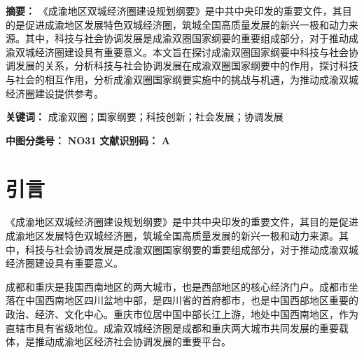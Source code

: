 \documentclass{CjC}
\begin{document}
\begin{center}

\vspace{10pt}


\vspace{10pt}

\end{center}

\vspace{10pt}

\songti

\textbf{摘要：} {\kaishu 《成渝地区双城经济圈建设规划纲要》是中共中央印发的重要文件，其目的是促进成渝地区发展特色双城经济圈，筑城全国高质量发展的新兴一极和动力来源。其中，科技与社会协调发展是成渝双圈国家纲要的重要组成部分，对于推动成渝双城经济圈建设具有重要意义。本文旨在探讨成渝双圈国家纲要中科技与社会协调发展的关系，分析科技与社会协调发展在成渝双圈国家纲要中的作用，探讨科技与社会的相互作用，分析成渝双圈国家纲要实施中的挑战与机遇，为推动成渝双城经济圈建设提供参考。}

\textbf{关键词：} 成渝双圈；国家纲要；科技创新；社会发展；协调发展

\textbf{中图分类号：} \textbf{NO31} \quad \textbf{文献识别码：} \textbf{A}

\vspace{10pt}

\section{引言}

《成渝地区双城经济圈建设规划纲要》是中共中央印发的重要文件，其目的是促进成渝地区发展特色双城经济圈，筑城全国高质量发展的新兴一极和动力来源。其中，科技与社会协调发展是成渝双圈国家纲要的重要组成部分，对于推动成渝双城经济圈建设具有重要意义。

成都和重庆是我国西南地区的两大城市，也是西部地区的核心经济门户\cite{戴宾2005成渝经济区与成渝城市集群}。成都市坐落在中国西南地区四川盆地中部，是四川省的首府都市，也是中国西部地区重要的政治、经济、文化中心。重庆市位居中国中部长江上游，地处中国西南地区，作为直辖市具有省级地位。成渝双城经济圈是成都和重庆两大城市共同发展的重要载体，是推动成渝地区经济社会协调发展的重要平台。
\end{document}
